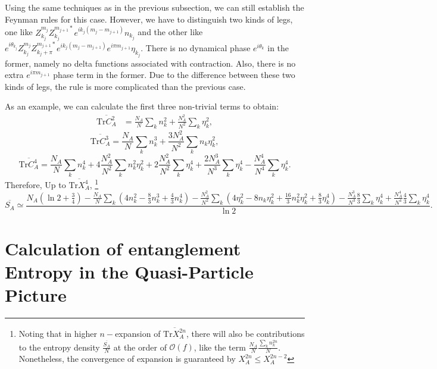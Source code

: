 \documentclass[aps,onecolumn,nofootinbib,superscriptaddress,notitlepage,longbibliography]{revtex4-1}
\def \Tr {\mathrm{Tr}}
\begin{document}
Using the same techniques as in the previous subsection, we can still
establish the Feynman rules for this case. However, we have to distinguish
two kinds of legs, one like %
$Z_{k_{j}}^{m_{j}}Z_{k_{j}}^{m_{j+1}*}e^{ik_{j}(m_{j}-m_{j+1})}n_{k_{j}}$
and the other like %
$e^{i\theta_{k_{j}}}Z_{k_{j}}^{m_{j}}Z_{k_{j}+\pi}^{m_{j+1}*}e^{ik_{j}(m_{j}-m_{j+1})}e^{i\pi m_{j+1}}\eta_{k_{j}}$.
There is no dynamical phase $e^{i\theta_{k}}$ in the former, namely no delta functions associated with contraction. Also, there is no extra $e^{i\pi m_{j+1}}$ phase term in the former.
Due to the difference between these two kinds of legs, the rule is more complicated than the previous case. 

As an example, we can calculate the first three non-trivial terms to obtain:
\begin{align*}
\overline{\Tr C_{A}^{2}} & =\frac{N_{A}}{N}\sum_{k}n_{k}^{2}+\frac{N_{A}^{2}}{N^{2}}\sum_{k}\eta_{k}^{2},
\end{align*}
\[
\overline{\Tr C_{A}^{3}}=\frac{N_{A}}{N}\sum_{k}n_{k}^{3}+\frac{3N_{A}^{2}}{N^{2}}\sum_{k}n_{k}\eta_{k}^{2},
\]
\[
\overline{\Tr C_{A}^{4}}=\frac{N_{A}}{N}\sum_{k}n_{k}^{4}+4\frac{N_{A}^{2}}{N^{2}}\sum_{k}n_{k}^{2}\eta_{k}^{2}+2\frac{N_{A}^{2}}{N^{2}}\sum_{k}\eta_{k}^{4}+\frac{2N_{A}^{3}}{N^{3}}\sum_{k}\eta_{k}^{4}-\frac{N_{A}^{4}}{N^{4}}\sum_{k}\eta_{k}^{4}.
\]
Therefore,  Up to $\overline{\Tr X_{A}^{4}}$, \footnote{Noting that in higher $n-$expansion of $\overline{\Tr X_{A}^{2n}}$, there
will also be contributions to the entropy density $\frac{\overline{S_A}}{N}$ at the order of $\mathcal{O}(f)$, like the term $\frac{N_{A}}{N}\frac{\sum_k n_{k}^{2n}}{N}$. Nonetheless, the convergence of expansion is guaranteed by $X_A^{2n}\leq X_A^{2n-2}$}
\[\overline{S_{A}}\simeq\frac{N_{A}(\ln2+\frac{3}{4})-\frac{N_{A}}{N}\sum_{k}(4n_{k}^{2}-\frac{8}{3}n_{k}^{3}+\frac{4}{3}n_{k}^{4})-\frac{N_{A}^{2}}{N^{2}}\sum_{k}(4\eta_{k}^{2}-8n_{k}\eta_{k}^{2}+\frac{16}{3}n_{k}^{2}\eta_{k}^{2}+\frac{8}{3}\eta_{k}^{4})-\frac{N_{A}^{3}}{N^{3}}\frac{8}{3}\sum_{k}\eta_{k}^{4}+\frac{N_{A}^4}{N^4}\frac{4}{3}\sum_{k}\eta_k^4}{\ln2}.
\]

\section{Calculation of entanglement Entropy in the Quasi-Particle Picture}
\end{document}
